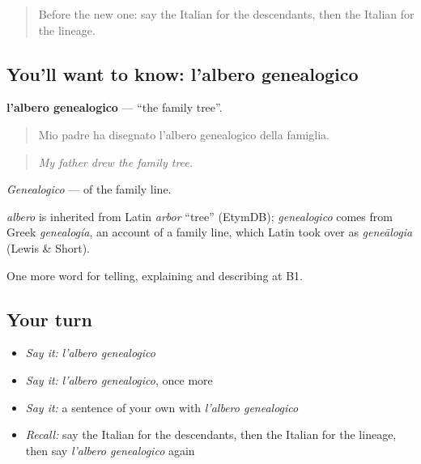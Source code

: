 \label{lesson:IT-C312-albero-genealogico}



\begin{quote}
Before the new one: say the Italian for the descendants, then the Italian for the lineage.
\end{quote}

\subsection*{You'll want to know: l'albero genealogico}
\textbf{l'albero genealogico} — \textquotedblleft{}the family tree\textquotedblright{}.

\begin{quote}
Mio padre ha disegnato l'albero genealogico della famiglia.
\end{quote}

\begin{quote}
\emph{My father drew the family tree.}
\end{quote}

\emph{Genealogico} — of the family line.

\begin{cousinweb}
\emph{albero} is inherited from Latin \emph{arbor} \textquotedblleft{}tree\textquotedblright{} (EtymDB); \emph{genealogico} comes from Greek \emph{genealogía}, an account of a family line, which Latin took over as \emph{geneālogia} (Lewis \& Short).
\end{cousinweb}

\begin{grammarlens}[title={What you've built}]
One more word for telling, explaining and describing at B1.
\end{grammarlens}

\subsection*{Your turn}
\begin{itemize}
\raggedright
  \item \emph{Say it:} \emph{l'albero genealogico}
  \item \emph{Say it:} \emph{l'albero genealogico}, once more
  \item \emph{Say it:} a sentence of your own with \emph{l'albero genealogico}
  \item \emph{Recall:} say the Italian for the descendants, then the Italian for the lineage, then say \emph{l'albero genealogico} again
\end{itemize}

